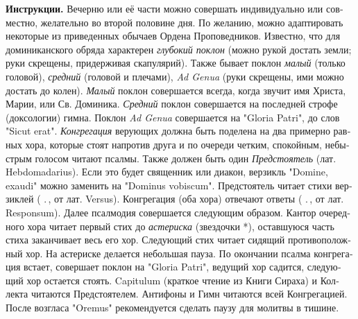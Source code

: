 \documentclass[14pt,a5paper]{extbook}
\makeatletter
\DeclareRobustCommand{\V}{\textbf{\vers@resp{-0.1em}{V}}.\,}
\DeclareRobustCommand{\R}{\textbf{\vers@resp{0pt}{R}}.\,}
\newcommand{\vers@resp@sym}{\raisebox{0.2ex}{\rotatebox[origin=c]{-20}{$\m@th\rceil$}}}
\newcommand{\vers@resp}[2]{%
  {\ooalign{\hidewidth\kern#1\vers@resp@sym\hidewidth\cr#2\cr}}%
}
\makeatother
\begin{document}
\begin{sloppy}
\begin{russian}
\begin{small}
\textbf{Инструкции.} Вечерню или её части можно совершать индивидуально или совместно, желательно во второй половине дня.
По желанию, можно адаптировать некоторые из приведенных обычаев Ордена Проповедников. 
Известно, что для доминиканского обряда характерен \textit{глубокий поклон} (можно рукой достать земли; руки скрещены, придерживая скапулярий). Также бывает поклон \textit{малый} (только головой), \textit{средний} (головой и плечами), \textit{Ad Genua} (руки скрещены, ими можно достать до колен).
\textit{Малый} поклон совершается всегда, когда звучит имя Христа, Марии, или Св. Доминика.
\textit{Средний} поклон совершается на последней строфе (доксологии) гимна.
Поклон \textit{Ad Genua} совершается на "Gloria Patri", до слов "Sicut erat".
\textit{Конгрегация} верующих должна быть поделена на два примерно равных хора, которые стоят напротив друга и по очереди четким, спокойным, небыстрым голосом читают псалмы. Также должен быть один \textit{Предстоятель} (лат. Hebdomadarius). Если это будет священник или диакон, верзикль "Domine, exaudi" можно заменить на "Dominus vobiscum".
Предстоятель читает стихи верзиклей (\V, от лат. Versus). Конгрегация (оба хора) отвечают ответы (\R, от лат. Responsum).
Далее псалмодия совершается следующим образом. Кантор очередного хора читает первый стих до \textit{астериска} (звездочки *), оставшуюся часть стиха заканчивает весь его хор. Следующий стих читает сидящий противоположный хор. На астериске делается небольшая пауза. По окончании псалма конгрегация встает, совершает поклон на "Gloria Patri", ведущий хор садится, следующий хор остается стоять.
Capitulum (краткое чтение из Книги Сираха) и Коллекта читаются Предстоятелем.
Антифоны и Гимн читаются всей Конгрегацией.
После возгласа "Oremus" рекомендуется сделать паузу для молитвы в тишине.




\end{small}
\end{russian}

\end{sloppy}
\end{document}
